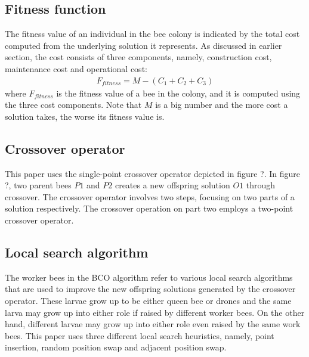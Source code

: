 
\subsection{Fitness function}
The fitness value of an individual in the bee colony is indicated by the total cost computed from the underlying solution it represents.
As discussed in earlier section, the cost consists of three components, namely, construction cost, maintenance cost and operational cost:
\begin{align}
	F_{fitness} = M - (C_1 + C_2 + C_3)
\end{align}
where $F_{fitness}$ is the fitness value of a bee in the colony, and it is computed using the three cost components.
Note that $M$ is a big number and the more cost a solution takes, the worse its fitness value is.

\subsection{Crossover operator}
This paper uses the single-point crossover operator depicted in figure ?.
In figure ?, two parent bees $P1$ and $P2$ creates a new offspring solution $O1$ through crossover.
The crossover operator involves two steps, focusing on two parts of a solution respectively.
The crossover operation on part two employs a two-point crossover operator.



\subsection{Local search algorithm}
The worker bees in the BCO algorithm refer to various local search algorithms that are used to improve the new offspring solutions generated by the crossover operator.
These larvae grow up to be either queen bee or drones and the same larva may grow up into either role if raised by different worker bees.
On the other hand, different larvae may grow up into either role even raised by the same work bees.
This paper uses three different local search heuristics, namely, point insertion, random position swap and adjacent position swap.





